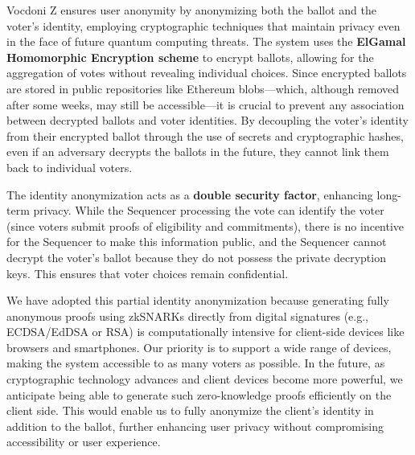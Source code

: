 
Vocdoni Z ensures user anonymity by anonymizing both the ballot and the voter's identity, employing cryptographic techniques that maintain privacy even in the face of future quantum computing threats. The system uses the \textbf{ElGamal Homomorphic Encryption scheme} to encrypt ballots, allowing for the aggregation of votes without revealing individual choices. Since encrypted ballots are stored in public repositories like Ethereum blobs—which, although removed after some weeks, may still be accessible—it is crucial to prevent any association between decrypted ballots and voter identities. By decoupling the voter's identity from their encrypted ballot through the use of secrets and cryptographic hashes, even if an adversary decrypts the ballots in the future, they cannot link them back to individual voters.

The identity anonymization acts as a \textbf{double security factor}, enhancing long-term privacy. While the Sequencer processing the vote can identify the voter (since voters submit proofs of eligibility and commitments), there is no incentive for the Sequencer to make this information public, and the Sequencer cannot decrypt the voter's ballot because they do not possess the private decryption keys. This ensures that voter choices remain confidential.

We have adopted this partial identity anonymization because generating fully anonymous proofs using zkSNARKs directly from digital signatures (e.g., ECDSA/EdDSA or RSA) is computationally intensive for client-side devices like browsers and smartphones. Our priority is to support a wide range of devices, making the system accessible to as many voters as possible. In the future, as cryptographic technology advances and client devices become more powerful, we anticipate being able to generate such zero-knowledge proofs efficiently on the client side. This would enable us to fully anonymize the client's identity in addition to the ballot, further enhancing user privacy without compromising accessibility or user experience.